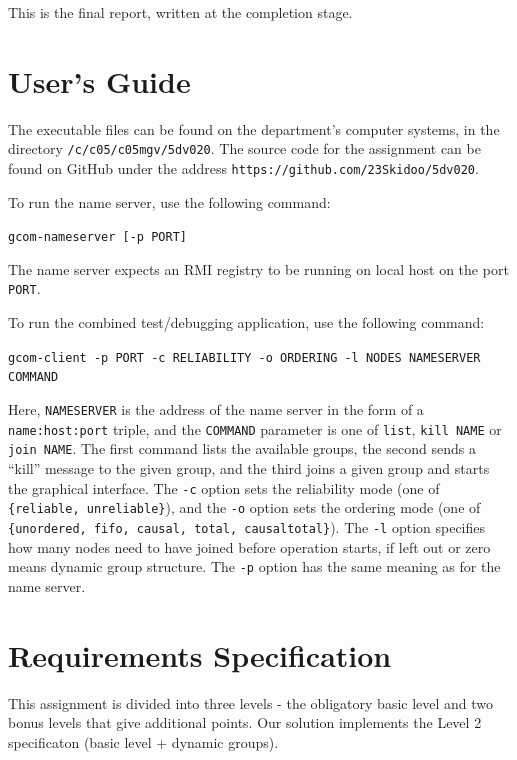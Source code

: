 \documentclass[10pt, oneside]{article}
\begin{document}
This is the final report, written at the completion stage.

\section{User's Guide}

The executable files can be found on the department's computer systems, in the
directory \texttt{/c/c05/c05mgv/5dv020}. The source code for the assignment can
be found on GitHub under the address
\texttt{https://github.com/23Skidoo/5dv020}.

To run the name server, use the following command:
\begin{center}\texttt{gcom-nameserver [-p PORT]}\end{center}

The name server expects an RMI registry to be running on local host on the port
\texttt{PORT}.

To run the combined test/debugging application, use the following command:
\begin{center}\texttt{gcom-client -p PORT -c RELIABILITY -o ORDERING -l NODES NAMESERVER COMMAND}\end{center}

Here, \texttt{NAMESERVER} is the address of the name server in the form of a
\texttt{name:host:port} triple, and the \texttt{COMMAND} parameter is one of
\texttt{list}, \texttt{kill NAME} or \texttt{join NAME}. The first command lists
the available groups, the second sends a ``kill'' message to the given group,
and the third joins a given group and starts the graphical interface. The
\texttt{-c} option sets the reliability mode (one of \texttt{\{reliable,
  unreliable\}}), and the \texttt{-o} option sets the ordering mode (one of
\texttt{\{unordered, fifo, causal, total, causaltotal\}}). The \texttt{-l} option
specifies how many nodes need to have joined before operation starts, if left
out or zero means dynamic group structure. The \texttt{-p} option has the same
meaning as for the name server.

\section{Requirements Specification}

This assignment is divided into three levels - the obligatory basic level and
two bonus levels that give additional points. Our solution implements the Level
2 specificaton (basic level + dynamic groups).
\end{document}
